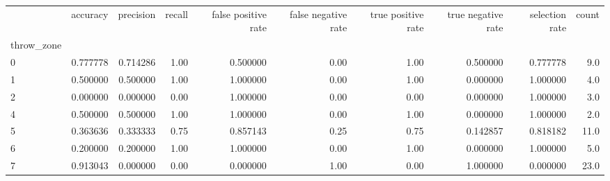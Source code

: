 \begin{tabular}{lrrrrrrrrr}
\toprule
{} &  accuracy &  precision &  recall &  false positive rate &  false negative rate &  true positive rate &  true negative rate &  selection rate &  count \\
throw\_zone &           &            &         &                      &                      &                     &                     &                 &        \\
\midrule
0          &  0.777778 &   0.714286 &    1.00 &             0.500000 &                 0.00 &                1.00 &            0.500000 &        0.777778 &    9.0 \\
1          &  0.500000 &   0.500000 &    1.00 &             1.000000 &                 0.00 &                1.00 &            0.000000 &        1.000000 &    4.0 \\
2          &  0.000000 &   0.000000 &    0.00 &             1.000000 &                 0.00 &                0.00 &            0.000000 &        1.000000 &    3.0 \\
4          &  0.500000 &   0.500000 &    1.00 &             1.000000 &                 0.00 &                1.00 &            0.000000 &        1.000000 &    2.0 \\
5          &  0.363636 &   0.333333 &    0.75 &             0.857143 &                 0.25 &                0.75 &            0.142857 &        0.818182 &   11.0 \\
6          &  0.200000 &   0.200000 &    1.00 &             1.000000 &                 0.00 &                1.00 &            0.000000 &        1.000000 &    5.0 \\
7          &  0.913043 &   0.000000 &    0.00 &             0.000000 &                 1.00 &                0.00 &            1.000000 &        0.000000 &   23.0 \\
\bottomrule
\end{tabular}
